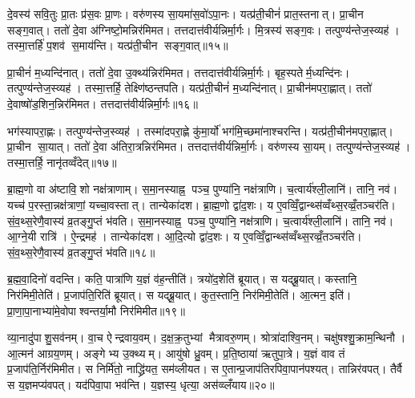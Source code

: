 दे॒वस्य॑ सवि॒तुः प्रा॒तः प्र॑स॒वः प्रा॒णः। वरु॑णस्य सा॒यमा॑स॒वो॑ऽपा॒नः। यत्प्र॑ती॒चीनं॑ प्रात॒स्तनात्। प्रा॒चीन सङ्ग॒वात्। ततो॑ दे॒वा अ॑ग्निष्टो॒मन्निर॑मिमत। तत्तदात्त॑वीर्यन्निर्मा॒र्गः। मि॒त्रस्य॑ सङ्ग॒वः। तत्पुण्य॑न्तेज॒स्व्यह॑। तस्मा॒त्तर्\mbox{}हि॑ प॒शव॑ स॒माय॑न्ति। यत्प्र॑ती॒चीन सङ्ग॒वात्॥१५॥

प्रा॒चीनं॑ म॒ध्यन्दि॑नात्। ततो॑ दे॒वा उ॒क्थ्य॑न्निर॑मिमत। तत्तदात्त॑वीर्यन्निर्मा॒र्गः। बृह॒स्पतेर्म॒ध्यन्दि॑नः। तत्पुण्य॑न्तेज॒स्व्यह॑। तस्मा॒त्तर्\mbox{}हि॒ तेक्ष्णि॑ष्ठन्तपति। यत्प्र॑ती॒चीनं॑ म॒ध्यन्दि॑नात्। प्रा॒चीन॑मपरा॒ह्णात्। ततो॑ दे॒वाष्षो॑ड॒शिन॒न्निर॑मिमत। तत्तदात्त॑वीर्यन्निर्मा॒र्गः॥१६॥

भग॑स्यापरा॒ह्णः। तत्पुण्य॑न्तेज॒स्व्यह॑। तस्मा॑दपरा॒ह्णे कु॑मा॒र्यो॑ भग॑मि॒च्छमा॑नाश्चरन्ति। यत्प्र॑ती॒चीन॑मपरा॒ह्णात्। प्रा॒चीन सा॒यात्। ततो॑ दे॒वा अ॑तिरा॒त्रन्निर॑मिमत। तत्तदात्त॑वीर्यन्निर्मा॒र्गः। वरु॑णस्य सा॒यम्। तत्पुण्य॑न्तेज॒स्व्यह॑। तस्मा॒त्तर्\mbox{}हि॒ नानृ॑तव्वँदेत्॥१७॥

ब्रा॒ह्म॒णो वा अ॑ष्टावि॒शो नक्ष॑त्राणाम्। स॒मा॒नस्याह्न॒ पञ्च॒ पुण्या॑नि॒ नक्ष॑त्राणि। च॒त्वार्य॑श्ली॒लानि॑। तानि॒ नव॑। यच्च॑ प॒रस्ता॒न्नक्ष॑त्राणां॒ यच्चा॒वस्तात्। तान्येका॑दश। ब्रा॒ह्म॒णो द्वा॑द॒शः। य ए॒वव्विँ॒द्वान्थ्स॑व्वँथ्स॒रव्व्रँ॒तञ्चर॑ति। सं॒व॒थ्स॒रेणै॒वास्य॑ व्र॒तङ्गु॒प्तं भ॑वति। स॒मा॒नस्याह्न॒ पञ्च॒ पुण्या॑नि॒ नक्ष॑त्राणि। च॒त्वार्य॑श्ली॒लानि॑। तानि॒ नव॑। आ॒ग्ने॒यी रात्रि॑। ऐ॒न्द्रमह॑। तान्येका॑दश। आ॒दि॒त्यो द्वा॑द॒शः। य ए॒वव्विँ॒द्वान्थ्स॑व्वँथ्स॒रव्व्रँ॒तञ्चर॑ति। सं॒व॒थ्स॒रेणै॒वास्य॑ व्र॒तङ्गु॒प्तं भ॑वति॥१८॥\anuvakamend[स॒ङ्ग॒वाथ्षो॑ड॒शिन॒न्निर॑मिमत॒ तत्तदात्त॑वीर्यन्निर्मा॒र्गो व॑देद्भवति समा॒नस्याह्न॒ पञ्च॒ पुण्या॑नि॒ नक्ष॑त्राण्य॒ष्टौ च॑]

ब्र॒ह्म॒वा॒दिनो॑ वदन्ति। कति॒ पात्रा॑णि य॒ज्ञं व॑ह॒न्तीति॑। त्रयो॑द॒शेति॑ ब्रूयात्। स यद्ब्रू॒यात्। कस्तानि॒ निर॑मिमी॒तेति॑। प्र॒जाप॑ति॒रिति॑ ब्रूयात्। स यद्ब्रू॒यात्। कुत॒स्तानि॒ निर॑मिमी॒तेति॑। आ॒त्मन॒ इति॑। प्रा॒णा॒पा॒नाभ्या॑मे॒वोपाश्वन्तर्या॒मौ निर॑मिमीत॥१९॥

व्या॒नादु॑पाशु॒सव॑नम्। वा॒च ऐन्द्रवाय॒वम्। द॒क्ष॒क्र॒तुभ्यां मैत्रावरु॒णम्। श्रोत्रा॑दाश्वि॒नम्। चक्षु॑षश्शु॒क्राम॒न्थिनौ। आ॒त्मन॑ आग्रय॒णम्। अङ्गेभ्य उ॒क्थ्यम्। आयु॑षो ध्रु॒वम्। प्र॒ति॒ष्ठाया॑ ऋतुपा॒त्रे। य॒ज्ञं वाव तं प्र॒जाप॑ति॒र्निर॑मिमीत। स निर्मि॑तो॒ नाद्ध्रि॑यत॒ सम॑व्लीयत। स ए॒तान्प्र॒जाप॑तिरपिवा॒पान॑पश्यत्। तान्निर॑वपत्। तैर्वै स य॒ज्ञमप्य॑वपत्। यद॑पिवा॒पा भव॑न्ति। य॒ज्ञस्य॒ धृत्या॒ अस॑व्व्लँयाय॥२०॥\anuvakamend[उ॒पा॒श्व॒न्त॒र्या॒मौ निर॑मिमीतामिमीत॒ षट्च॑]

